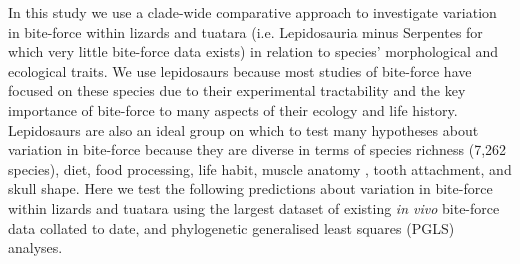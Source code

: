 \documentclass[a4paper, 12pt]{article}
\begin{document}
In this study we use a clade-wide comparative approach to investigate variation in bite-force within lizards and tuatara (i.e. Lepidosauria minus Serpentes for which very little bite-force data exists) in relation to species' morphological and ecological traits. 
We use lepidosaurs because most studies of bite-force have focused on these species due to their experimental tractability and the key importance of bite-force to many aspects of their ecology and life history\cite{herrel1999morphology,lappin2014reliable}.
Lepidosaurs are also an ideal group on which to test many hypotheses about variation in bite-force because they are diverse in terms of species richness (7,262 species\cite{uetz2020reptile}), diet\cite{cooper2002distribution}, food processing\cite{mcbrayer2002prey}, life habit\cite{meiri2018traits}, muscle anatomy \cite{haas1973muscles,daza2011jaw}, tooth attachment\cite{jenkins2020bite}, and skull shape\cite{metzger2005correlations}. 
Here we test the following predictions about variation in bite-force within lizards and tuatara using the largest dataset of existing \textit{in vivo} bite-force data collated to date, and phylogenetic generalised least squares (PGLS) analyses.
\end{document}

